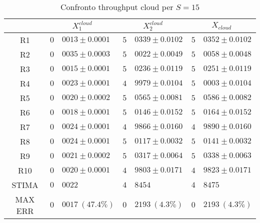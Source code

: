 \begin{table}[!h]
\begin{tabular}{c|r@{.}l|r@{.}l|r@{.}l}
& \multicolumn{2}{|c|}{$X_1^{cloud}$}
& \multicolumn{2}{|c|}{$X_2^{cloud}$}
& \multicolumn{2}{|c}{$X_{cloud}$} 
\\          
\hline
R1      & $0$&$0013 \pm 0.0001$ & $5$&$0339 \pm 0.0102$ & $5$&$0352 \pm 0.0102$ \\
R2      & $0$&$0035 \pm 0.0003$ & $5$&$0022 \pm 0.0049$ & $5$&$0058 \pm 0.0048$ \\
R3      & $0$&$0015 \pm 0.0001$ & $5$&$0236 \pm 0.0119$ & $5$&$0251 \pm 0.0119$ \\
R4      & $0$&$0023 \pm 0.0001$ & $4$&$9979 \pm 0.0104$ & $5$&$0003 \pm 0.0104$ \\
R5      & $0$&$0020 \pm 0.0002$ & $5$&$0565 \pm 0.0081$ & $5$&$0586 \pm 0.0082$ \\
R6      & $0$&$0018 \pm 0.0001$ & $5$&$0146 \pm 0.0152$ & $5$&$0164 \pm 0.0152$ \\
R7      & $0$&$0024 \pm 0.0001$ & $4$&$9866 \pm 0.0160$ & $4$&$9890 \pm 0.0160$ \\
R8      & $0$&$0024 \pm 0.0001$ & $5$&$0117 \pm 0.0032$ & $5$&$0141 \pm 0.0032$ \\
R9      & $0$&$0021 \pm 0.0002$ & $5$&$0317 \pm 0.0064$ & $5$&$0338 \pm 0.0063$ \\
R10     & $0$&$0020 \pm 0.0001$ & $4$&$9803 \pm 0.0171$ & $4$&$9823 \pm 0.0171$ \\
STIMA   & $0$&$0022$            & $4$&$8454$            & $4$&$8475$            \\
MAX ERR & $0$&$0017 \ (47.4\%)$ & $0$&$2193 \ (4.3\%)$  & $0$&$2193 \ (4.3\%)$    
\end{tabular}
\centering
\caption{Confronto throughput cloud per $S=15$}
\label{tab:15_xcloud}
\end{table}
